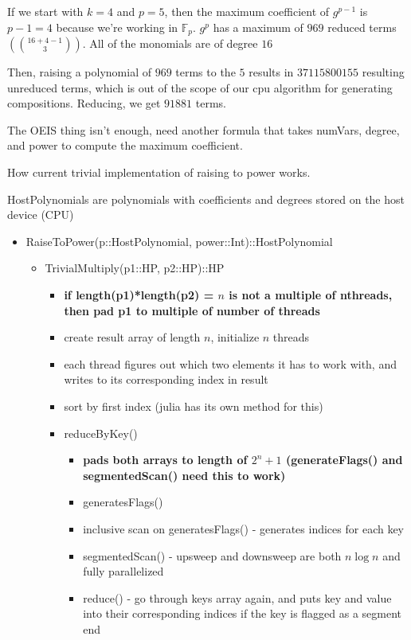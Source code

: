 \documentclass{article}
\begin{document}
If we start with $k = 4$ and $p = 5$, then the maximum coefficient of $g^{p-1}$ is $p - 1 = 4$ because we're working in $\mathbb{F}_p$. $g^p$ has a maximum of $969$ reduced terms $(\binom{16+4-1}{3})$. All of the monomials are of degree $16$

Then, raising a polynomial of $969$ terms to the $5$ results in $37115800155$ resulting unreduced terms, which is out of the scope of our cpu algorithm for generating compositions. Reducing, we get $91881$ terms.

The OEIS thing isn't enough, need another formula that takes numVars, degree, and power to compute the maximum coefficient.


How current trivial implementation of raising to power works.

HostPolynomials are polynomials with coefficients and degrees stored on the host device (CPU)
\begin{itemize}
    \item{RaiseToPower(p::HostPolynomial, power::Int)::HostPolynomial}
    \begin{itemize}
        \item{TrivialMultiply(p1::HP, p2::HP)::HP}
        \begin{itemize}
            \item{\textbf{if length(p1)*length(p2) = $n$ is not a multiple of nthreads, then pad p1 to multiple of number of threads}}
            \item{create result array of length $n$, initialize $n$ threads}
            \item{each thread figures out which two elements it has to work with, and writes to its corresponding index in result}
            \item{sort by first index (julia has its own method for this)}
            \item{reduceByKey()}
            \begin{itemize}
                \item {\textbf{pads both arrays to length of $2^n + 1$ (generateFlags() and segmentedScan() need this to work)}}
                \item {generatesFlags()}
                \item {inclusive scan on generatesFlags() - generates indices for each key}
                \item {segmentedScan() - upsweep and downsweep are both $n \log n$ and fully parallelized}
                \item {reduce() - go through keys array again, and puts key and value into their corresponding indices if the key is flagged as a segment end}
            \end{itemize}
        \end{itemize}
    \end{itemize}
\end{itemize}
\end{document}
